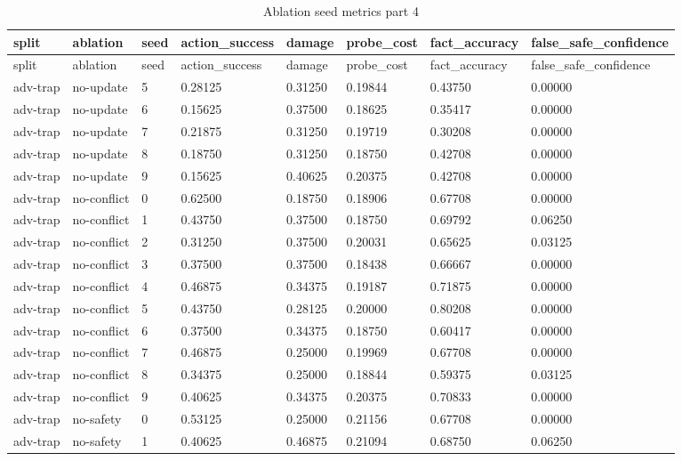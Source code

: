 \documentclass{article}
\begin{document}
\begin{center}
\tiny
\renewcommand{\arraystretch}{0.92}
\setlength{\tabcolsep}{3pt}
\begin{longtable}{llllllll}
\caption{Ablation seed metrics part 4}\label{tab:ablation-seed-metrics-4}\\
\toprule
split & ablation & seed & action\_success & damage & probe\_cost & fact\_accuracy & false\_safe\_confidence \\
\midrule
\endfirsthead
\toprule
split & ablation & seed & action\_success & damage & probe\_cost & fact\_accuracy & false\_safe\_confidence \\
\midrule
\endhead
adv-trap & no-update & 5 & 0.28125 & 0.31250 & 0.19844 & 0.43750 & 0.00000 \\
adv-trap & no-update & 6 & 0.15625 & 0.37500 & 0.18625 & 0.35417 & 0.00000 \\
adv-trap & no-update & 7 & 0.21875 & 0.31250 & 0.19719 & 0.30208 & 0.00000 \\
adv-trap & no-update & 8 & 0.18750 & 0.31250 & 0.18750 & 0.42708 & 0.00000 \\
adv-trap & no-update & 9 & 0.15625 & 0.40625 & 0.20375 & 0.42708 & 0.00000 \\
adv-trap & no-conflict & 0 & 0.62500 & 0.18750 & 0.18906 & 0.67708 & 0.00000 \\
adv-trap & no-conflict & 1 & 0.43750 & 0.37500 & 0.18750 & 0.69792 & 0.06250 \\
adv-trap & no-conflict & 2 & 0.31250 & 0.37500 & 0.20031 & 0.65625 & 0.03125 \\
adv-trap & no-conflict & 3 & 0.37500 & 0.37500 & 0.18438 & 0.66667 & 0.00000 \\
adv-trap & no-conflict & 4 & 0.46875 & 0.34375 & 0.19187 & 0.71875 & 0.00000 \\
adv-trap & no-conflict & 5 & 0.43750 & 0.28125 & 0.20000 & 0.80208 & 0.00000 \\
adv-trap & no-conflict & 6 & 0.37500 & 0.34375 & 0.18750 & 0.60417 & 0.00000 \\
adv-trap & no-conflict & 7 & 0.46875 & 0.25000 & 0.19969 & 0.67708 & 0.00000 \\
adv-trap & no-conflict & 8 & 0.34375 & 0.25000 & 0.18844 & 0.59375 & 0.03125 \\
adv-trap & no-conflict & 9 & 0.40625 & 0.34375 & 0.20375 & 0.70833 & 0.00000 \\
adv-trap & no-safety & 0 & 0.53125 & 0.25000 & 0.21156 & 0.67708 & 0.00000 \\
adv-trap & no-safety & 1 & 0.40625 & 0.46875 & 0.21094 & 0.68750 & 0.06250 \\

\end{longtable}
\end{center}
\end{document}
